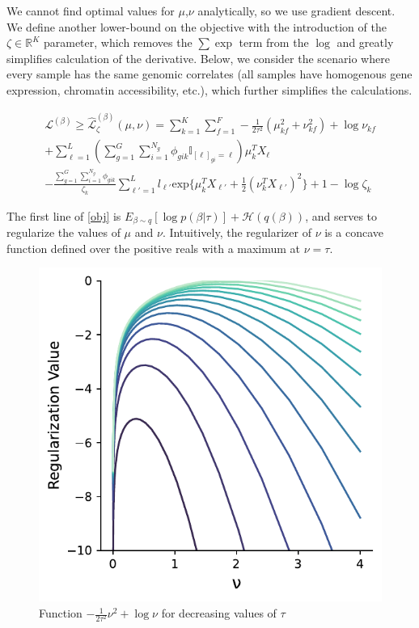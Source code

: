 \documentclass{article}
\newcommand{\Lagr}{\mathcal{L}}
\begin{document}
We cannot find optimal values for $\mu$,$\nu$ analytically, so we use gradient descent. We define another  lower-bound on the objective with the introduction of the $\zeta \in \mathbb{R}^K$ parameter, which removes the $\sum\exp$ term from the $\log$ and greatly simplifies calculation of the derivative. Below, we consider the scenario where every sample has the same genomic correlates (all samples have homogenous gene expression, chromatin accessibility, etc.), which further simplifies the calculations. 

\begin{equation} \label{obj}
\begin{split}
\Lagr^{(\beta)} \geq \hat{\Lagr}^{(\beta)}_{\zeta}(\mu,\nu) = \sum_{k=1}^{K}\sum_{f=1}^F  -\frac{1}{2\tau^2}(\mu_{kf}^2 + \nu_{kf}^2) + \log{\nu_{kf}} \\
	+ \sum_{\ell=1}^L \left(\sum_{g=1}^G\sum_{i=1}^{N_g} \phi_{gik} \mathbb{I}_{[\ell]_{gi} = \ell} \right) \mu_k^T X_{\ell} \\
	- \frac{ \sum_{g=1}^G\sum_{i=1}^{N_g} \phi_{gik} }{\zeta_k}  \sum_{\ell'=1}^L l_{\ell'}\textrm{exp}\{ \mu_k^T X_{\ell'} + \frac{1}{2}(\nu_k^T X_{\ell'})^2\} + 1 - \log{\zeta_k}
\end{split}
\end{equation}

The first line of \eqref{obj} is $E_{\beta \sim q}[\log p(\beta | \tau)]+\mathcal{H}(q(\beta))$, and serves to regularize the values of $\mu$ and $\nu$. Intuitively, the regularizer of $\nu$ is a concave function defined over the positive reals with a maximum at $\nu = \tau$. 

\begin{figure}[h]
\caption{Function $-\frac{1}{2\tau^2}\nu^2 + \log\nu$ for decreasing values of $\tau$}
\centering
\includegraphics[scale=0.65]{nu_regularization.pdf}
\end{figure}
\end{document}
